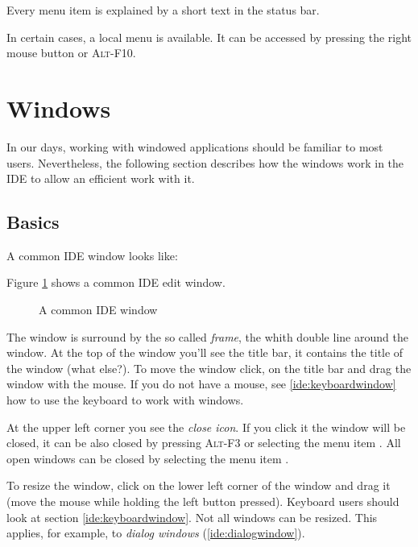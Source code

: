 Every menu item is explained by a short text in the status bar.

In certain cases, a local menu is available. It can be accessed by pressing
the right mouse button or \textsc{Alt-F10}.

\section{Windows}
In our days, working with windowed applications should be familiar to
most users. Nevertheless, the following section describes how
the windows work in the \fpc IDE to allow an efficient work with it.

\subsection{Basics}
\begin{htmlonly}
A common IDE window looks like:
\end{htmlonly}
\begin{latexonly}
Figure \ref{fig:idewin} shows a common IDE edit window.
\begin{figure}
\caption{A common IDE window}
\label{fig:idewin}
\ifpdf
{}
\else
\fi
\end{figure}
\end{latexonly}
The window is surround by the so called \emph{frame}, the whith double
line around the window.
At the top of the window you'll see the title bar, it contains the title
of the window (what else?). To move the window click, on
the title bar and drag the window with the mouse.
If you do not have a mouse, see \ref{ide:keyboardwindow} how
to use the keyboard to work with windows.

At the upper left corner you see the \emph{close icon}. If you click it the
window will be closed, it can be also closed by pressing \textsc{Alt-F3} or
selecting the menu item . All open windows can be closed
by selecting the menu item .

To resize the window, click on the lower left corner of the window
and drag it (move the mouse while holding the left button pressed).
Keyboard users should look at section \ref{ide:keyboardwindow}.
Not all windows can be resized. This applies, for example, to
\emph{dialog windows} (\ref{ide:dialogwindow}).

